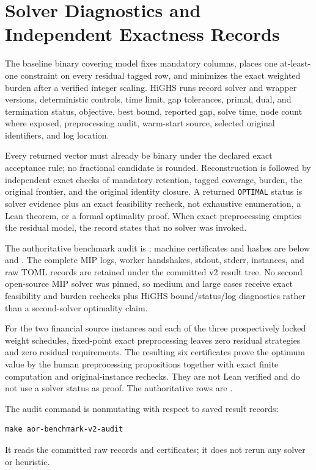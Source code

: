 \section{Solver Diagnostics and Independent Exactness Records}
\label{sec:or-solver-exactness}

The baseline binary covering model fixes mandatory columns, places one
at-least-one constraint on every residual tagged row, and minimizes the exact
weighted burden after a verified integer scaling. HiGHS runs record solver and
wrapper versions, deterministic controls, time limit, gap tolerances, primal,
dual, and termination status, objective, best bound, reported gap, solve time,
node count where exposed, preprocessing audit, warm-start source, selected
original identifiers, and log location.

Every returned vector must already be binary under the declared exact
acceptance rule; no fractional candidate is rounded. Reconstruction is followed
by independent exact checks of mandatory retention, tagged coverage, burden,
the original frontier, and the original identity closure. A returned
\texttt{OPTIMAL} status is solver evidence plus an exact feasibility recheck,
not exhaustive enumeration, a Lean theorem, or a formal optimality proof.
When exact preprocessing empties the residual model, the record states that no
solver was invoked.

The authoritative benchmark audit is
; machine
certificates and hashes are below
 and
.
The complete MIP logs, worker handshakes, stdout, stderr, instances, and raw
TOML records are retained under the committed v2 result tree. No second
open-source MIP solver was pinned, so medium and large cases receive exact
feasibility and burden rechecks plus HiGHS bound/status/log diagnostics rather
than a second-solver optimality claim.

For the two financial source instances and each of the three prospectively
locked weight schedules, fixed-point exact preprocessing leaves zero residual
strategies and zero residual requirements. The resulting six certificates
prove the optimum value by the human preprocessing propositions together with
exact finite computation and original-instance rechecks. They are not Lean
verified and do not use a solver status as proof. The authoritative rows are
.

The audit command is nonmutating with respect to saved result records:
\begin{verbatim}
make aor-benchmark-v2-audit
\end{verbatim}
It reads the committed raw records and certificates; it does not rerun any
solver or heuristic.
